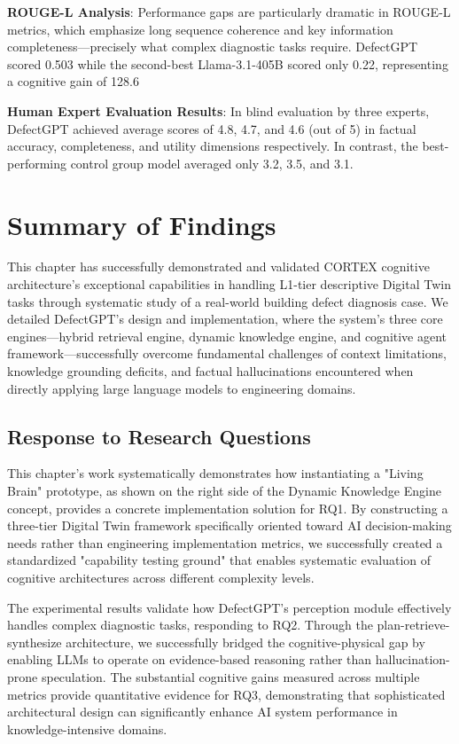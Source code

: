 \textbf{ROUGE-L Analysis}: Performance gaps are particularly dramatic in ROUGE-L metrics, which emphasize long sequence coherence and key information completeness—precisely what complex diagnostic tasks require. DefectGPT scored 0.503 while the second-best Llama-3.1-405B scored only 0.22, representing a cognitive gain of 128.6%

\textbf{Human Expert Evaluation Results}: In blind evaluation by three experts, DefectGPT achieved average scores of 4.8, 4.7, and 4.6 (out of 5) in factual accuracy, completeness, and utility dimensions respectively. In contrast, the best-performing control group model averaged only 3.2, 3.5, and 3.1.


\section{Summary of Findings}

This chapter has successfully demonstrated and validated CORTEX cognitive architecture's exceptional capabilities in handling L1-tier descriptive Digital Twin tasks through systematic study of a real-world building defect diagnosis case. We detailed DefectGPT's design and implementation, where the system's three core engines—hybrid retrieval engine, dynamic knowledge engine, and cognitive agent framework—successfully overcome fundamental challenges of context limitations, knowledge grounding deficits, and factual hallucinations encountered when directly applying large language models to engineering domains.

\subsection{Response to Research Questions}

This chapter's work systematically demonstrates how instantiating a "Living Brain" prototype, as shown on the right side of the Dynamic Knowledge Engine concept, provides a concrete implementation solution for RQ1. By constructing a three-tier Digital Twin framework specifically oriented toward AI decision-making needs rather than engineering implementation metrics, we successfully created a standardized "capability testing ground" that enables systematic evaluation of cognitive architectures across different complexity levels.

The experimental results validate how DefectGPT's perception module effectively handles complex diagnostic tasks, responding to RQ2. Through the plan-retrieve-synthesize architecture, we successfully bridged the cognitive-physical gap by enabling LLMs to operate on evidence-based reasoning rather than hallucination-prone speculation. The substantial cognitive gains measured across multiple metrics provide quantitative evidence for RQ3, demonstrating that sophisticated architectural design can significantly enhance AI system performance in knowledge-intensive domains.

